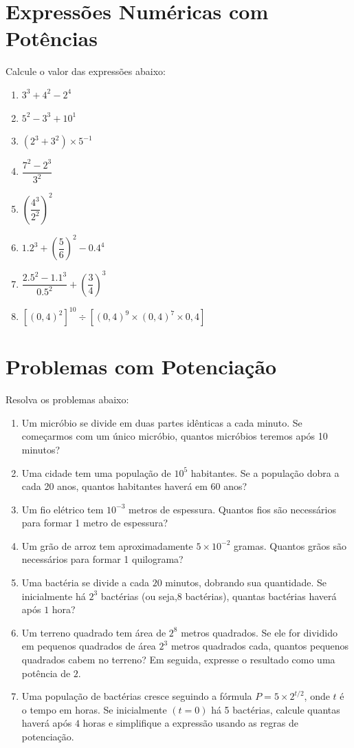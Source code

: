 \documentclass[a4paper,12pt]{article}
\begin{document}
\begin{multicols}{2}
\begin{enumerate}
		\end{enumerate}
		
		
		\section*{Expressões Numéricas com Potências} \vspace{-5mm}
		Calcule o valor das expressões abaixo: \vspace{-3mm}
		\begin{enumerate}
			\item $3^3 + 4^2 - 2^4$
			\item $5^2 - 3^3 + 10^1$
			\item $\left(2^3 + 3^2\right) \times 5^{-1}$
			\item $\dfrac{7^2 - 2^3}{3^2}$
			\item $\left(\dfrac{4^3}{2^2}\right)^2$
			\item $1.2^3 + \left(\dfrac{5}{6}\right)^2 - 0.4^4$
			\item $\dfrac{2.5^2 - 1.1^3}{0.5^2} + \left(\dfrac{3}{4}\right)^3$
			\item $ [ (0,4)^{2} ]^{10} \div [ (0,4)^{9} \times (0,4)^{7} \times 0,4] $
		\end{enumerate}
		
		\section*{Problemas com Potenciação}
		Resolva os problemas abaixo:
		\begin{enumerate}
			\item Um micróbio se divide em duas partes idênticas a cada minuto. Se começarmos com um único micróbio, quantos micróbios teremos após 10 minutos?
			\item Uma cidade tem uma população de $10^5$ habitantes. Se a população dobra a cada 20 anos, quantos habitantes haverá em 60 anos?
			\item Um fio elétrico tem $10^{-3}$ metros de espessura. Quantos fios são necessários para formar 1 metro de espessura?
			\item Um grão de arroz tem aproximadamente $5 \times 10^{-2}$ gramas. Quantos grãos são necessários para formar 1 quilograma?
			\item Uma bactéria se divide a cada $20$ minutos, dobrando sua quantidade. Se inicialmente há $2^3$ 	bactérias (ou seja,$ 8$ bactérias), quantas bactérias haverá após $1$ hora?
			\item Um terreno quadrado tem área de $2^8$
			metros quadrados. Se ele for dividido em pequenos quadrados de área $2^3$
			metros quadrados cada, quantos pequenos quadrados cabem no terreno? Em seguida, expresse o resultado como uma potência de $2$.
			\item Uma população de bactérias cresce seguindo a fórmula 
		$P =	5\times 2^{t/2}$, onde $t$ é o tempo em horas. Se inicialmente $(t=0)$ há 5 bactérias, calcule quantas haverá após $4$ horas e simplifique a expressão usando as regras de potenciação.
		\end{enumerate}		
	\end{multicols}
\end{document}
